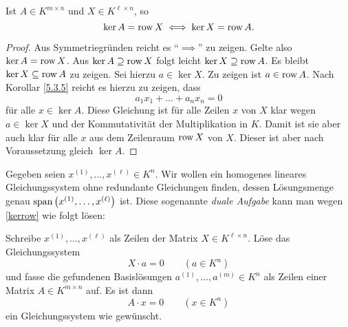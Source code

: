 \documentclass[../../main.tex]{subfiles}
\begin{document}
\begin{kor}\mbox{}\label{kerrow}
Ist $A\in K^{m\times n}$ und $X\in K^{\ell\times n}$, so
\[\ker A=\operatorname{row} X\iff\ker X=\operatorname{row} A.\]
\end{kor}

\begin{proof}
Aus Symmetriegründen reicht es "`$\implies$"' zu zeigen. Gelte also $\ker A=\operatorname{row} X$.
Aus $\ker A\supseteq\operatorname{row} X$ folgt leicht $\ker X\supseteq\operatorname{row} A$. Es bleibt $\ker X\subseteq\operatorname{row} A$ zu zeigen.
Sei hierzu $a\in\ker X$. Zu zeigen ist $a\in\operatorname{row} A$. Nach Korollar \ref{5.3.5} reicht es hierzu zu zeigen, dass
\[a_1x_1+\ldots+a_nx_n=0\]
für alle $x\in\ker A$. Diese Gleichung ist für alle Zeilen $x$ von $X$ klar wegen $a\in\ker X$ und der
Kommutativität der Multiplikation in $K$. Damit ist sie aber
auch klar für alle $x$ aus dem Zeilenraum $\operatorname{row} X$ von $X$. Dieser ist aber nach Voraussetzung gleich $\ker A$.
\end{proof}

\begin{bem}\label{dualproblem}
Gegeben seien $x^{(1)},\ldots,x^{(\ell)}\in K^n$. Wir wollen ein homogenes lineares Gleichungssystem ohne redundante Gleichungen finden, dessen Lösungsmenge genau
$\operatorname{span}\left(x^{(1)},\ldots,x^{(\ell)}\right)$ ist. Diese sogenannte \emph{duale Aufgabe} kann man wegen \ref{kerrow} wie folgt lösen:

Schreibe $x^{(1)},\ldots,x^{(\ell)}$ als Zeilen der Matrix $X\in K^{\ell\times n}$. Löse das Gleichungssystem
\[X\cdot a = 0\qquad(a\in K^n)\]
und fasse die gefundenen Basislösungen $a^{(1)},\ldots, a^{(m)}\in K^n$ als Zeilen einer Matrix $A\in K^{m\times n}$ auf. Es ist dann
\[A\cdot x = 0\qquad(x\in K^n)\]
ein Gleichungssystem wie gewünscht.
\end{bem}
\end{document}
